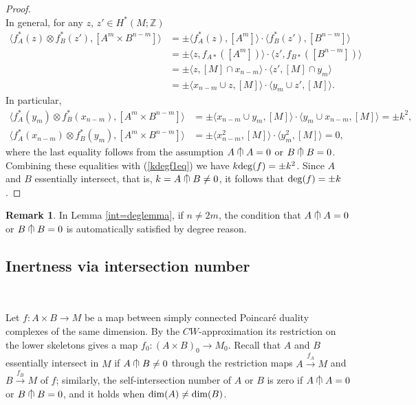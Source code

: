 \documentclass[a4]{amsart}
\theoremstyle{definition}
\newtheorem{remark}[theorem]{Remark}
\newcommand{\testcap}{\mathrel{\vcenter{\offinterlineskip
\hbox{$\cap$}\vskip-1.8ex\hbox{$\kern0.2em | \kern0.15em$}}}}
\begin{document}
\begin{sloppypar}
\begin{proof}
\begin{equation}
\end{equation}
In general, for any $z$, $z'\in H^\ast(M;\mathbb{Z})$ 
\[
\begin{split}
\langle f_A^\ast(z)\otimes f_B^\ast(z'), [A^m\times B^{n-m}]\rangle 
&=\pm\langle f_A^\ast(z), [A^{m}]\rangle \cdot \langle f_B^\ast(z'), [B^{n-m}]\rangle\\
&=\pm\langle z, f_{A\ast}([A^{m}])\rangle \cdot \langle z', f_{B\ast}([B^{n-m}])\rangle\\
&=\pm\langle z, [M]\cap x_{n-m}\rangle \cdot  \langle z', [M]\cap y_{m}\rangle \\
&=\pm\langle x_{n-m}\cup z, [M]\rangle \cdot \langle y_{m}\cup z', [M]\rangle.
\end{split}
\]
In particular, 
\[
\begin{split}
\langle f_A^\ast(y_{m})\otimes f_B^\ast(x_{n-m}), [A^{m}\times B^{n-m}]\rangle 
&=\pm\langle x_{n-m}\cup y_m, [M]\rangle \cdot \langle y_{m}\cup x_{n-m}, [M]\rangle=\pm k^2, \\
\langle f_A^\ast(x_{n-m})\otimes f_B^\ast(y_{m}), [A^{m}\times B^{n-m}]\rangle 
&= \pm \langle x_{n-m}^2, [M]\rangle \cdot \langle y_{m}^2, [M]\rangle =0,
\end{split}
\]
where the last equality follows from the assumption $A\testcap A=0$ or $B\testcap B=0$.
Combining these equalities with (\ref{kdegf1eq}) we have $k{\rm deg}(f)=\pm k^2$. 
Since $A$ and $B$ essentially intersect, that is, $k=A\testcap B\neq 0$, it follows that ${\rm deg}(f)=\pm k$.
\end{proof}

\begin{remark}\label{int=degrmk}
In Lemma \ref{int=deglemma}, if $n\neq 2m$, the condition that $A\testcap A=0$ or $B\testcap B=0$ is automatically satisfied by degree reason. 
\end{remark}
\subsection{Inertness via intersection number}
\label{subsec: iner-int} 

$\, $

Let $f: A\times B\stackrel{}{\longrightarrow} M$ be a map between simply connected Poincar\'{e} duality complexes of the same dimension. By the $CW$-approximation its restriction on the lower skeletons gives a map $f_0: (A\times B)_0\stackrel{}{\longrightarrow} M_0$. 
Recall that $A$ and $B$ essentially intersect in $M$ if $A\testcap B\neq 0$ through the restriction maps $A\stackrel{f_A}{\longrightarrow} M$ and $B\stackrel{f_B}{\longrightarrow} M$ of $f$; similarly, the self-intersection number of $A$ or $B$ is zero if $A\testcap A=0$ or  $B\testcap B=0$, and it holds when ${\rm dim}(A)\neq {\rm dim}(B)$. 


\end{sloppypar}
\end{document}
